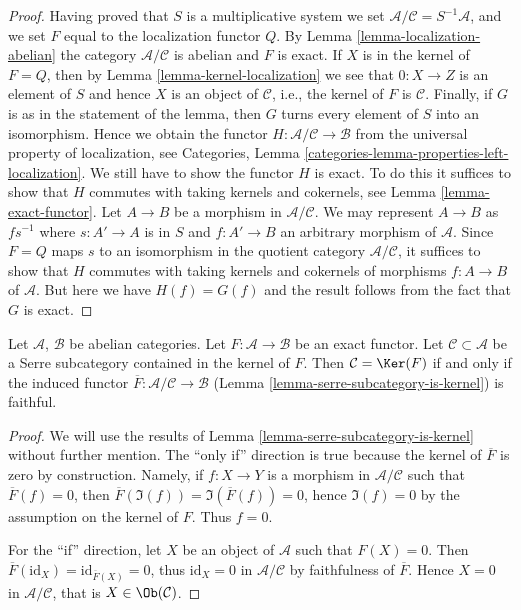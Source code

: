 \begin{proof}
\medskip\noindent
Having proved that $S$ is a multiplicative system we set
$\mathcal{A}/\mathcal{C} = S^{-1}\mathcal{A}$, and we set
$F$ equal to the localization functor $Q$. By
Lemma \ref{lemma-localization-abelian}
the category $\mathcal{A}/\mathcal{C}$ is abelian and $F$ is exact.
If $X$ is in the kernel of $F = Q$, then by
Lemma \ref{lemma-kernel-localization}
we see that $0 : X \to Z$ is an element of $S$ and hence
$X$ is an object of $\mathcal{C}$, i.e., the kernel of
$F$ is $\mathcal{C}$.
Finally, if $G$ is as in the statement of the lemma, then $G$ turns
every element of $S$ into an isomorphism. Hence we obtain the
functor $H : \mathcal{A}/\mathcal{C} \to \mathcal{B}$ from
the universal property of localization, see
Categories, Lemma \ref{categories-lemma-properties-left-localization}.
We still have to show the functor $H$ is exact.
To do this it suffices to show that $H$ commutes
with taking kernels and cokernels, see Lemma \ref{lemma-exact-functor}.
Let $A \to B$ be a morphism in $\mathcal{A}/\mathcal{C}$.
We may represent $A \to B$ as $fs^{-1}$ where $s : A' \to A$
is in $S$ and $f : A' \to B$ an arbitrary morphism of $\mathcal{A}$.
Since $F = Q$ maps $s$ to an isomorphism in the quotient category
$\mathcal{A}/\mathcal{C}$, it suffices to show that $H$ commutes with taking
kernels and cokernels of morphisms $f : A \to B$ of $\mathcal{A}$.
But here we have $H(f) = G(f)$ and the result follows
from the fact that $G$ is exact.
\end{proof}

\begin{lemma}
\label{lemma-quotient-by-kernel-exact-functor}
Let $\mathcal{A}$, $\mathcal{B}$ be abelian categories.
Let $F : \mathcal{A} \to \mathcal{B}$ be an exact functor.
Let $\mathcal{C} \subset \mathcal{A}$ be a Serre subcategory
contained in the kernel of $F$.
Then $\mathcal{C} = \Ker(F)$ if and only if the induced functor
$\overline{F} : \mathcal{A}/\mathcal{C} \to \mathcal{B}$
(Lemma \ref{lemma-serre-subcategory-is-kernel}) is faithful.
\end{lemma}

\begin{proof}
We will use the results of Lemma \ref{lemma-serre-subcategory-is-kernel}
without further mention.
The ``only if'' direction is true because the kernel of $\overline{F}$ is zero
by construction. Namely, if $f : X \to Y$ is a morphism in
$\mathcal{A}/\mathcal{C}$ such that $\overline{F}(f) = 0$, then
$\overline{F}(\Im(f)) = \Im(\overline{F}(f)) = 0$, hence $\Im(f) = 0$ by the
assumption on the kernel of $F$. Thus $f = 0$.

\medskip\noindent
For the ``if'' direction, let $X$ be an object of $\mathcal{A}$ such that $F(X)
= 0$. Then $\overline{F}(\text{id}_X) = \text{id}_{\overline{F}(X)} = 0$, thus
$\text{id}_X = 0$ in $\mathcal{A}/\mathcal{C}$ by faithfulness of
$\overline{F}$. Hence $X = 0$ in $\mathcal{A}/\mathcal{C}$, that is $X \in
\Ob(\mathcal{C})$.
\end{proof}






